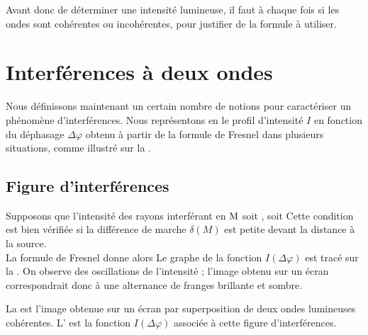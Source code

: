 \documentclass[12pt,fancy]{cours}
\begin{document}
\begin{danger}
  Avant donc de déterminer une intensité lumineuse, il faut  à chaque fois si les ondes sont cohérentes ou incohérentes, pour justifier de la formule à utiliser.
\end{danger}


\section{Interférences à deux ondes}
Nous définissons maintenant un certain nombre de notions pour caractériser un phénomène d'interférences. Nous représentons en  le profil d'intensité $I$ en fonction du déphasage $\Delta \varphi$ obtenu à partir de la formule de Fresnel  dans plusieurs situations, comme illustré sur la .




\subsection{Figure d'interférences} 

Supposons que l'intensité des rayons interférant en $\rm M$ soit , soit 
Cette condition est bien vérifiée si la différence de marche $\delta(M)$ est petite devant la distance à la source.\\ 

La formule de Fresnel donne alors
Le graphe de la fonction $I(\Delta\varphi)$ est tracé sur la . On observe des oscillations de l'intensité ; l'image obtenu sur un écran correspondrait donc à une alternance de franges brillante et sombre.
\begin{definition}\label{def:}
  La  est l'image obtenue sur un écran par superposition de deux ondes lumineuses cohérentes. L' est la fonction $I(\Delta\varphi)$ associée à cette figure d'interférences.
  \end{definition}
\end{document}
